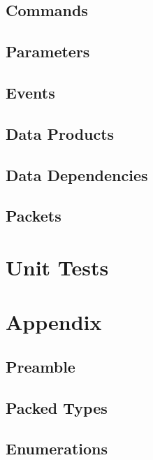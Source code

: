 \subsection{Commands}



\subsection{Parameters}



\subsection{Events}



\subsection{Data Products}



\subsection{Data Dependencies}



\subsection{Packets}



\section{Unit Tests}



\section{Appendix}

\subsection{Preamble}



\subsection{Packed Types}



\subsection{Enumerations}




